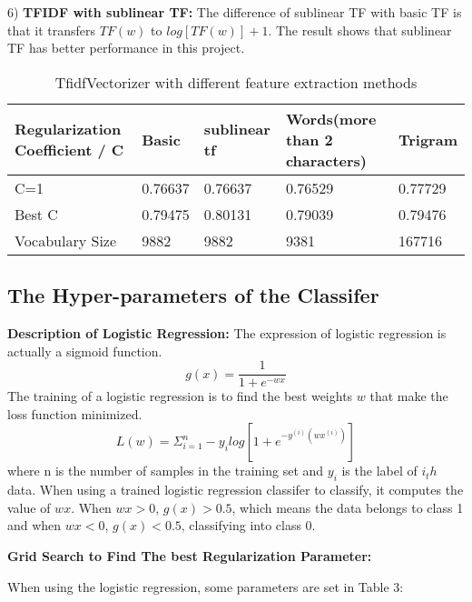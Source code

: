 \documentclass[letterpaper, 10 pt, conference]{ieeeconf}  %
\begin{document}
6) \textbf{TFIDF with sublinear TF: }The difference of sublinear TF with basic TF is that it transfers $TF(w)$ to $log[TF(w)]+1$. The result shows that sublinear TF has better performance in this project. 



\begin{table}  
	\caption{TfidfVectorizer with different feature extraction methods}  
	\begin{center}  
		\begin{tabu} to 1\textwidth{X[3,c]|X[1,b]|X[2,l]|X[3,c]|X[2,m]}  
			\hline  
			Regularization Coefficient / C  &Basic             &sublinear tf      &Words(more than 2 characters)         &Trigram\\  
			\hline  
			C=1    &0.76637       &0.76637           &0.76529    &0.77729      \\  
			Best C    &0.79475      &0.80131           &0.79039    &0.79476     \\  
			Vocabulary Size    &9882      &9882           &9381         &167716\\  
			
			\hline  
		\end{tabu}  
	\end{center}  
\end{table} 

\subsection{The Hyper-parameters of the Classifer}
\textbf{Description of Logistic Regression:}
The expression of logistic regression is actually a sigmoid function.
$$
g(x)=\frac{1}{1+e^{-wx}}
$$
The training of a logistic regression is to find the best weights $w$ that make the loss function minimized.
$$
L(w)=\Sigma_{i=1}^n-y_ilog[1+e^{-y^{(i)}(wx^{(i)})}]
$$
where n is the number of samples in the training set and $y_i$ is the label of $i_th$ data. When using a trained logistic regression classifer to classify, it computes the value of $wx$. When $wx>0$, $g(x)>0.5$, which means the data belongs to class 1 and when $wx<0$, $g(x)<0.5$, classifying into class 0. 

\textbf{Grid Search to Find The best Regularization Parameter: }

When using the logistic regression, some parameters are set in Table 3:
\end{document}
